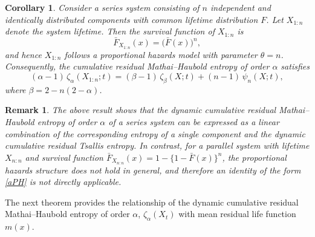 \documentclass[11pt,reqno]{amsart}
\theoremstyle{tight}
\newtheorem{corollary}{Corollary}[section]
\newtheorem{remark}{Remark}[section]
\begin{document}
\begin{corollary}
Consider a series system consisting of $n$ independent and identically distributed components with common lifetime distribution $F$. Let $X_{1:n}$ denote the system lifetime. Then the survival function of $X_{1:n}$ is
\[
\bar{F}_{X_{1:n}}(x)=\bigl(\bar{F}(x)\bigr)^n,
\]
and hence $X_{1:n}$ follows a proportional hazards model with parameter $\theta=n$.
Consequently, the cumulative residual Mathai--Haubold entropy of order $\alpha$ satisfies
\[
(\alpha-1)\,\zeta_{\alpha}(X_{1:n};t)
= (\beta-1)\,\zeta_{\beta}(X;t)
+ (n-1)\,\psi_{n}(X;t),
\]
where $\beta = 2-n(2-\alpha)$.
\end{corollary}

\begin{remark}
The above result shows that the dynamic cumulative residual Mathai--Haubold entropy of order $\alpha$ of a
series system can be expressed as a linear combination of the corresponding entropy
of a single component and the dynamic cumulative residual Tsallis entropy.
In contrast, for a parallel system with lifetime $X_{n:n}$ and survival function
$\bar{F}_{X_{n:n}}(x)=1-\{1-\bar{F}(x)\}^n$, the proportional hazards structure does not
hold in general, and therefore an identity of the form \eqref{aPH} is not directly
applicable.
\end{remark}



\begin{flushleft}
The next theorem provides the relationship of the dynamic cumulative residual Mathai--Haubold entropy of order $\alpha$, $\zeta_{\alpha}(X_t)$ with mean residual life function $m(x)$.
\end{flushleft}
\end{document}

